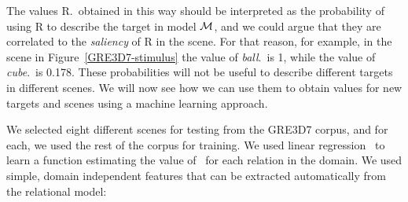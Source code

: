 %
%
%
%
The values R.\puse\ obtained in this way should be interpreted as the probability of using R to describe the target in model $\mathcal{M}$, and we could argue that they are correlated to the \emph{saliency} of R in the scene.  
For that reason, for example, in the scene in Figure~\ref{GRE3D7-stimulus} the value of \emph{ball}.\puse\ is 1, while the value of \emph{cube}.\puse\ is 0.178.  These probabilities will not be useful to describe different targets in different scenes.  We will now see how we can use them to obtain values for new targets and scenes using a machine learning approach. 




We selected eight different scenes for testing from the GRE3D7 corpus, and for each, we used the rest of the corpus for training. We used linear regression~\cite{Hall:WEK09} to learn a function estimating the value of \puse\ for each relation in the domain.  We used simple, domain independent features that can be extracted automatically from the relational model:  

